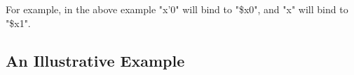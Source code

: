 \documentclass[12pt,english,letterpaper]{article}
\begin{document}
For example, in the above example "x'0" will bind to "\$x0", and "x"
will bind to "\$x1".













\subsection{An Illustrative Example}
\end{document}
